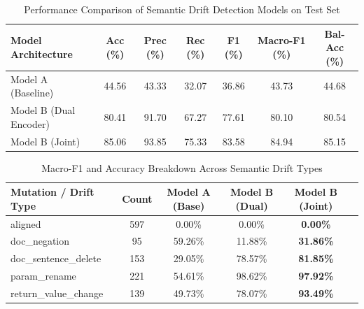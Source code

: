 \begin{table}[htbp]
\caption{Performance Comparison of Semantic Drift Detection Models on Test Set}
\label{tab:model_comparison}
\centering
\begin{tabular}{lcccccc}
\hline
\textbf{Model Architecture} & \textbf{Acc (\%)} & \textbf{Prec (\%)} & \textbf{Rec (\%)} & \textbf{F1 (\%)} & \textbf{Macro-F1 (\%)} & \textbf{Bal-Acc (\%)} \\
\hline
Model A (Baseline) & 44.56 & 43.33 & 32.07 & 36.86 & 43.73 & 44.68 \\
Model B (Dual Encoder) & 80.41 & 91.70 & 67.27 & 77.61 & 80.10 & 80.54 \\
Model B (Joint) & 85.06 & 93.85 & 75.33 & 83.58 & 84.94 & 85.15 \\
\hline
\end{tabular}
\end{table}

\begin{table}[htbp]
\caption{Macro-F1 and Accuracy Breakdown Across Semantic Drift Types}
\label{tab:drift_type_breakdown}
\centering
\begin{tabular}{lccccc}
\hline
\textbf{Mutation / Drift Type} & \textbf{Count} & \textbf{Model A (Base)} & \textbf{Model B (Dual)} & \textbf{Model B (Joint)} \\
\hline
aligned                   & 597   & 0.00\% & 0.00\% & \textbf{0.00\%} \\
doc_negation              & 95    & 59.26\% & 11.88\% & \textbf{31.86\%} \\
doc_sentence_delete       & 153   & 29.05\% & 78.57\% & \textbf{81.85\%} \\
param_rename              & 221   & 54.61\% & 98.62\% & \textbf{97.92\%} \\
return_value_change       & 139   & 49.73\% & 78.07\% & \textbf{93.49\%} \\
\hline
\end{tabular}
\end{table}
